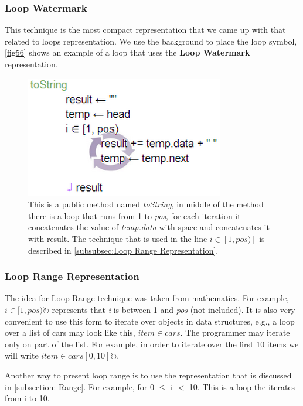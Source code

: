 \subsubsection{Loop Watermark}
This technique is the most compact representation that we came up with that related to loops representation. We use the background to place the loop symbol, \autoref{fig56} shows an example of a loop that uses the \textbf{Loop Watermark} representation.
\begin{figure}[H]
\includegraphics{"./fig/Loop Watermark"}
\caption{This is a public method named \textit{toString}, in middle of the method there is a loop that runs from 1 to \textit{pos}, for each iteration it concatenates the value of \textit{temp.data} with space and concatenates it with result. The technique that is used in the line $ i \in [1, pos)] $ is described in \autoref{subsubsec:Loop Range Representation}.}
\label{fig56}
\end{figure}
\subsubsection{Loop Range Representation} \label{subsubsec:Loop Range Representation}
The idea for Loop Range technique was taken from mathematics. For example, $ i \in [1, pos) \circlearrowright $ represents that \textit{i} is between 1 and \textit{pos} (not included). It is also very convenient to use this form to iterate over objects in data structures, e.g., a loop over a list of cars may look like this, $ item \in cars $. The programmer may iterate only on part of the list. For example, in order to iterate over the first 10 items we will write $ item \in cars[0, 10] \circlearrowright $.

Another way to present loop range is to use the representation that is discussed in \autoref{subsection: Range}. For example, for 0 $ \leq $ i $ < $ 10. This is a loop the iterates from i to 10.

